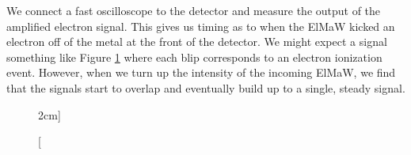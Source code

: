 We connect a fast oscilloscope to the detector and measure the output of the amplified electron signal. This gives us timing as to when the ElMaW kicked an electron off of the metal at the front of the detector. We might expect a signal something like Figure \ref{fig:detectorsignal} where each blip corresponds to an electron ionization event. However, when we turn up the intensity of the incoming ElMaW, we find that the signals start to overlap and eventually build up to a single, steady signal.
\begin{figure}
\centering
{}
\caption[][2cm]{ }
\label{fig:detectorsignal}
\end{figure}

